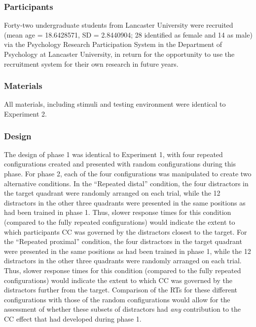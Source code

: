 \documentclass[
  man,
  floatsintext,
  longtable,
  nolmodern,
  notxfonts,
  notimes,
  colorlinks=true,linkcolor=blue,citecolor=blue,urlcolor=blue]{apa7}
\begin{document}
\subsubsection{Participants}\label{participants-2}

Forty-two undergraduate students from Lancaster University were
recruited (mean age = 18.6428571, SD = 2.8440904; 28 identified as
female and 14 as male) via the Psychology Research Participation System
in the Department of Psychology at Lancaster University, in return for
the opportunity to use the recruitment system for their own research in
future years.

\subsubsection{Materials}\label{materials-2}

All materials, including stimuli and testing environment were identical
to Experiment 2.

\subsubsection{Design}\label{design-2}

The design of phase 1 was identical to Experiment 1, with four repeated
configurations created and presented with random configurations during
this phase. For phase 2, each of the four configurations was manipulated
to create two alternative conditions. In the ``Repeated distal''
condition, the four distractors in the target quadrant were randomly
arranged on each trial, while the 12 distractors in the other three
quadrants were presented in the same positions as had been trained in
phase 1. Thus, slower response times for this condition (compared to the
fully repeated configurations) would indicate the extent to which
participants CC was governed by the distractors closest to the target.
For the ``Repeated proximal'' condition, the four distractors in the
target quadrant were presented in the same positions as had been trained
in phase 1, while the 12 distractors in the other three quadrants were
randomly arranged on each trial. Thus, slower response times for this
condition (compared to the fully repeated configurations) would indicate
the extent to which CC was governed by the distractors further from the
target. Comparison of the RTs for these different configurations with
those of the random configurations would allow for the assessment of
whether these subsets of distractors had \emph{any} contribution to the
CC effect that had developed during phase 1.
\end{document}

